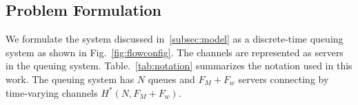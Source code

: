 

%




\subsection{Problem Formulation}
\label{subsec:problem}


We formulate the system discussed in~\ref{subsec:model} as a discrete-time queuing system as shown in 
Fig.~\ref{fig:flowconfig}. The channels are represented as servers in the queuing system. Table.~\ref{tab:notation} 
summarizes the notation used in this work. The queuing system has $N$ queues and $F_M+F_w$ servers connecting 
by time-varying channels $H^*(N,F_M+F_w)$.


